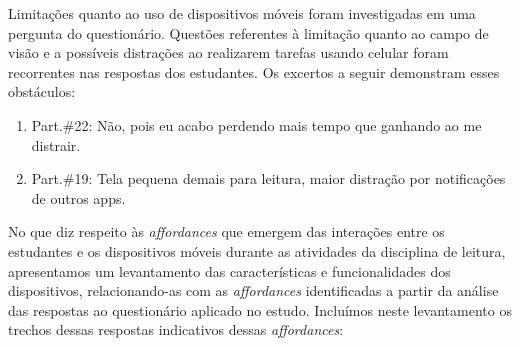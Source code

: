 \documentclass[portuguese]{textolivre}
\begin{document}
Limitações quanto ao uso de dispositivos móveis foram investigadas em uma  pergunta do questionário. Questões referentes à limitação quanto ao campo de visão e a possíveis distrações ao realizarem tarefas usando celular foram recorrentes nas respostas dos estudantes. Os excertos a seguir demonstram esses obstáculos:

\begin{enumerate}[resume]
\item Part.\#22: Não, pois eu acabo perdendo mais tempo que ganhando ao me distrair. 
\item Part.\#19: Tela pequena demais para leitura, maior distração por notificações de outros apps.
\end{enumerate}

No que diz respeito às \emph{affordances} que emergem das interações entre os estudantes e os dispositivos móveis durante as atividades da disciplina de leitura, apresentamos um levantamento das características e funcionalidades dos dispositivos, relacionando-as com as \emph{affordances} identificadas a partir da análise das respostas ao questionário aplicado no estudo. Incluímos neste levantamento os trechos dessas respostas indicativos dessas \emph{affordances}:
\end{document}
